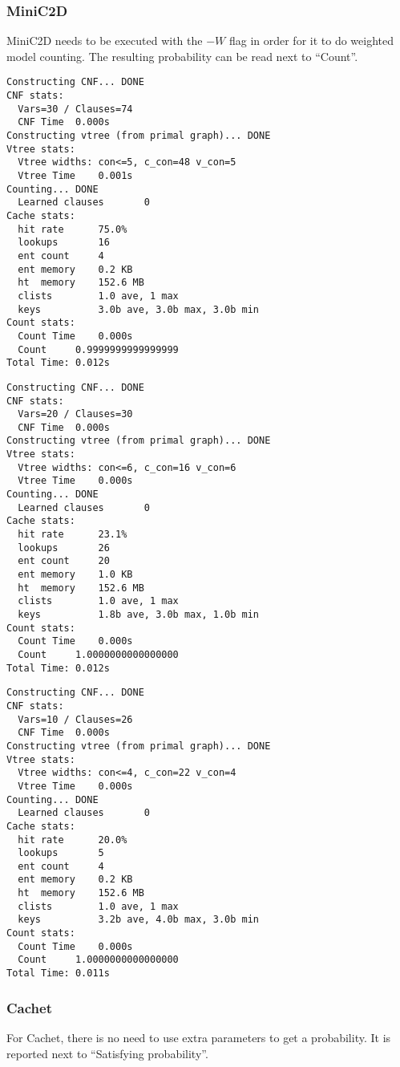 \subsubsection{MiniC2D}
MiniC2D needs to be executed with the $-W$ flag in order for it to do weighted model counting.
The resulting probability can be read next to ``Count''.

\begin{lstlisting}[caption={MiniC2D on ENC1 encoding of Cancer network}]
Constructing CNF... DONE
CNF stats:
  Vars=30 / Clauses=74
  CNF Time	0.000s
Constructing vtree (from primal graph)... DONE
Vtree stats:
  Vtree widths: con<=5, c_con=48 v_con=5
  Vtree Time	0.001s
Counting... DONE
  Learned clauses      	0
Cache stats:
  hit rate   	75.0%
  lookups    	16
  ent count  	4
  ent memory 	0.2 KB
  ht  memory 	152.6 MB
  clists     	1.0 ave, 1 max
  keys       	3.0b ave, 3.0b max, 3.0b min
Count stats:
  Count Time	0.000s
  Count 	0.9999999999999999
Total Time: 0.012s
\end{lstlisting}

\begin{lstlisting}[caption={MiniC2D on ENC2 encoding of Cancer network}]
Constructing CNF... DONE
CNF stats:
  Vars=20 / Clauses=30
  CNF Time	0.000s
Constructing vtree (from primal graph)... DONE
Vtree stats:
  Vtree widths: con<=6, c_con=16 v_con=6
  Vtree Time	0.000s
Counting... DONE
  Learned clauses      	0
Cache stats:
  hit rate   	23.1%
  lookups    	26
  ent count  	20
  ent memory 	1.0 KB
  ht  memory 	152.6 MB
  clists     	1.0 ave, 1 max
  keys       	1.8b ave, 3.0b max, 1.0b min
Count stats:
  Count Time	0.000s
  Count 	1.0000000000000000
Total Time: 0.012s
\end{lstlisting}

\begin{lstlisting}[caption={MiniC2D on CNF encoding of Monty Hall}]
Constructing CNF... DONE
CNF stats:
  Vars=10 / Clauses=26
  CNF Time	0.000s
Constructing vtree (from primal graph)... DONE
Vtree stats:
  Vtree widths: con<=4, c_con=22 v_con=4
  Vtree Time	0.000s
Counting... DONE
  Learned clauses      	0
Cache stats:
  hit rate   	20.0%
  lookups    	5
  ent count  	4
  ent memory 	0.2 KB
  ht  memory 	152.6 MB
  clists     	1.0 ave, 1 max
  keys       	3.2b ave, 4.0b max, 3.0b min
Count stats:
  Count Time	0.000s
  Count 	1.0000000000000000
Total Time: 0.011s
\end{lstlisting}

\subsubsection{Cachet}
For Cachet, there is no need to use extra parameters to get a probability.
It is reported next to ``Satisfying probability''.

